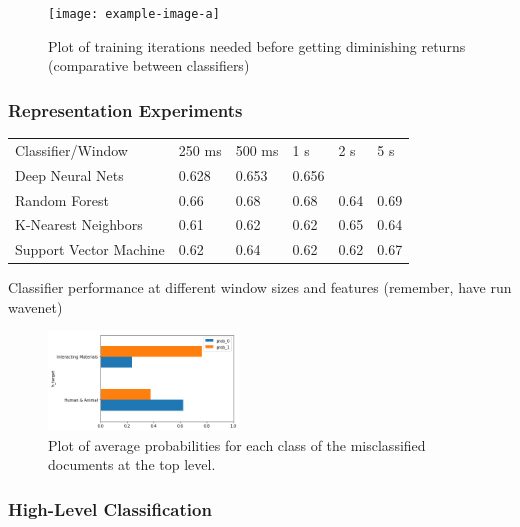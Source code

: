 \begin{figure}
    \centering
    \texttt{[image: example-image-a]}
    \caption{Plot of training iterations needed before getting diminishing returns (comparative between classifiers)}
    \label{fig:learning-curve}
\end{figure}

\subsubsection{Representation Experiments}

\begin{table}[]
    \begin{tabular}{llllll}
    Classifier/Window       & 250 ms & 500 ms & 1 s   & 2 s  & 5 s   \\
    Deep Neural Nets        & 0.628  & 0.653  & 0.656 &      &       \\
    Random Forest           & 0.66   & 0.68   & 0.68  & 0.64 & 0.69  \\
    K-Nearest Neighbors     & 0.61   & 0.62   & 0.62  & 0.65 & 0.64 \\
    Support Vector Machine  & 0.62   & 0.64   & 0.62  & 0.62 & 0.67   
    \end{tabular}
\end{table}

Classifier performance at different window sizes and features (remember, have run wavenet)

\begin{figure}[h]
    \centering
    \includegraphics[width=0.45\textwidth]{figures/knn-prob-plot.png}
    \caption{Plot of average probabilities for each class of the misclassified documents at the top level.}
    \label{fig:a}
\end{figure}

\subsubsection{High-Level Classification}

